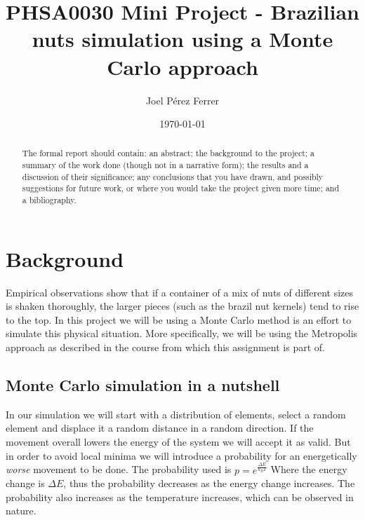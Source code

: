\documentclass[12pt]{article}
\begin{document}
\title{PHSA0030  Mini Project - Brazilian nuts simulation using a Monte Carlo approach} %
\author{Joel Pérez Ferrer} %

\date{\today}  %

\maketitle  %



\begin{abstract} 
  The formal report should contain: an abstract; the background to the project; a summary of the work done (though not in a narrative form); the results and a discussion of their significance; any conclusions that you have drawn, and possibly suggestions for future work, or where you would take the project given more time; and a bibliography.


\end{abstract}

\section{Background} %

Empirical observations show that if a container of a mix of nuts of different sizes is shaken thoroughly, the larger pieces (such as the brazil nut kernels) tend to rise to the top. In this project we will be using a Monte Carlo method is an effort to simulate this physical situation. More specifically, we will be using the Metropolis approach as described in the course from which this assignment is part of.

\subsection{Monte Carlo simulation in a nutshell}
In our simulation we will start with a distribution of elements, select a random element and displace it a random distance in a random direction. If the movement overall lowers the energy of the system we will accept it as valid. But in order to avoid local minima we will introduce a probability for an energetically \textit{worse} movement to be done. The probability used is $ p = e^{\frac{\Delta E}{k_B T}} $ Where the energy change is $\Delta E$, thus the probability decreases as the energy change increases. The probability also increases as the temperature increases, which can be observed in nature.
\end{document}
